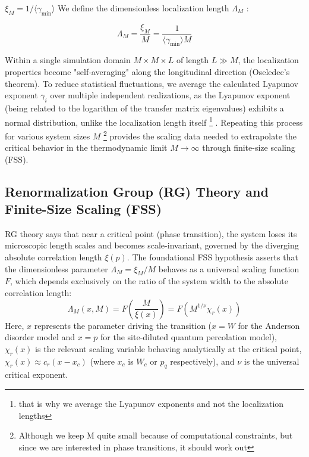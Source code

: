 $\xi_M = 1/\langle \gamma_{\text{min}} \rangle$
We define the dimensionless localization length $\Lambda_M$ :

\begin{equation}
\Lambda_M = \frac{\xi_M}{M} = \frac{1}{\langle \gamma_{\text{min}} \rangle M}
\end{equation}

Within a single simulation domain $M \times M \times L$ of length $L \gg M$, the localization properties become "self-averaging" along the longitudinal direction (Oseledec's theorem). To reduce statistical fluctuations, we average the calculated Lyapunov exponent $\gamma_i$ over multiple independent realizations, as the Lyapunov exponent (being related to the logarithm of the transfer matrix eigenvalues) exhibits a normal distribution, unlike the localization length itself 
\footnote{that is why we average the Lyapunov exponents and not the localization lengths}
. Repeating this process for various system sizes $M$
\footnote{Although we keep M quite small because of computational constraints, but since we are interested in phase transitions, it should work out}
provides the scaling data needed to extrapolate the critical behavior in the thermodynamic limit $M \to \infty$ through finite-size scaling (FSS). 

\subsection{Renormalization Group (RG) Theory and Finite-Size Scaling (FSS)} \label{subsec:rg}

RG theory says that near a critical point (phase transition), the system loses its microscopic length scales and becomes scale-invariant, governed by the diverging absolute correlation length $\xi(p)$. The foundational FSS hypothesis asserts that the dimensionless parameter $\Lambda_M = \xi_M / M$ behaves as a universal scaling function $F$, which depends exclusively on the ratio of the system width to the absolute correlation length:
\begin{equation}
\Lambda_M(x, M) = F\left( \frac{M}{\xi(x)} \right) = F\left( M^{1/\nu} \chi_r(x) \right) \label{eq:fss_basic}
\end{equation}
Here, $x$ represents the parameter driving the transition ($x=W$ for the Anderson disorder model and $x=p$ for the site-diluted quantum percolation model), $\chi_r(x)$ is the relevant scaling variable behaving analytically at the critical point, $\chi_r(x) \approx c_r (x - x_c)$ (where $x_c$ is $W_c$ or $p_q$ respectively), and $\nu$ is the universal critical exponent\cite{Slevin1999, Ujfalusi2014}.


